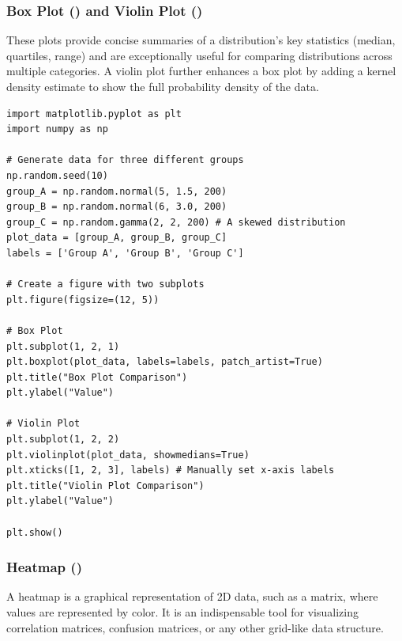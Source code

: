 \subsubsection*{Box Plot () and Violin Plot ()}
These plots provide concise summaries of a distribution's key statistics (median, quartiles, range) and are exceptionally useful for comparing distributions across multiple categories. A violin plot further enhances a box plot by adding a kernel density estimate to show the full probability density of the data.

\begin{example}
\text{ }\begin{verbatim}
import matplotlib.pyplot as plt
import numpy as np

# Generate data for three different groups
np.random.seed(10)
group_A = np.random.normal(5, 1.5, 200)
group_B = np.random.normal(6, 3.0, 200)
group_C = np.random.gamma(2, 2, 200) # A skewed distribution
plot_data = [group_A, group_B, group_C]
labels = ['Group A', 'Group B', 'Group C']

# Create a figure with two subplots
plt.figure(figsize=(12, 5))

# Box Plot
plt.subplot(1, 2, 1)
plt.boxplot(plot_data, labels=labels, patch_artist=True)
plt.title("Box Plot Comparison")
plt.ylabel("Value")

# Violin Plot
plt.subplot(1, 2, 2)
plt.violinplot(plot_data, showmedians=True)
plt.xticks([1, 2, 3], labels) # Manually set x-axis labels
plt.title("Violin Plot Comparison")
plt.ylabel("Value")

plt.show()
\end{verbatim}
\end{example}

\subsubsection*{Heatmap ()}
A heatmap is a graphical representation of 2D data, such as a matrix, where values are represented by color. It is an indispensable tool for visualizing correlation matrices, confusion matrices, or any other grid-like data structure.


